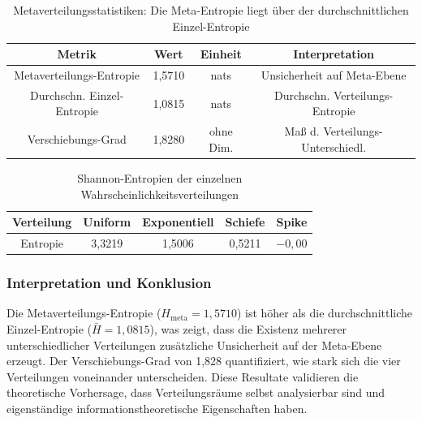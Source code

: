 ﻿\documentclass[a4paper,12pt]{article}
\theoremstyle{definition}
\begin{document}
\begin{table}[h]
	\centering
	\begin{tabular}{|c|c|c|c|}
		\hline
		\textbf{Metrik} & \textbf{Wert} & \textbf{Einheit} & \textbf{Interpretation} \\
		\hline
		Metaverteilungs-Entropie & 1,5710 & nats & Unsicherheit auf Meta-Ebene \\
		\hline
		Durchschn. Einzel-Entropie & 1,0815 & nats & Durchschn. Verteilungs-Entropie \\
		\hline
		Verschiebungs-Grad & 1,8280 & ohne Dim. & Maß d. Verteilungs-Unterschiedl. \\
		\hline
	\end{tabular}
	\caption{Metaverteilungsstatistiken: Die Meta-Entropie liegt über der durchschnittlichen Einzel-Entropie}
	\label{tab:exp05_meta}
\end{table}

\begin{table}[h]
	\centering
	\begin{tabular}{|c|c|c|c|c|}
		\hline
		\textbf{Verteilung} & \textbf{Uniform} & \textbf{Exponentiell} & \textbf{Schiefe} & \textbf{Spike} \\
		\hline
		Entropie & 3,3219 & 1,5006 & 0,5211 & $-0,00$ \\
		\hline
	\end{tabular}
	\caption{Shannon-Entropien der einzelnen Wahrscheinlichkeitsverteilungen}
	\label{tab:exp05_entropies}
\end{table}

\subsubsection{Interpretation und Konklusion}

Die Metaverteilungs-Entropie ($H_{\text{meta}} = 1,5710$) ist höher als die durchschnittliche Einzel-Entropie ($\bar{H} = 1,0815$), was zeigt, dass die Existenz mehrerer unterschiedlicher Verteilungen zusätzliche Unsicherheit auf der Meta-Ebene erzeugt. Der Verschiebungs-Grad von 1,828 quantifiziert, wie stark sich die vier Verteilungen voneinander unterscheiden. Diese Resultate validieren die theoretische Vorhersage, dass Verteilungsräume selbst analysierbar sind und eigenständige informationstheoretische Eigenschaften haben.

\end{document}
